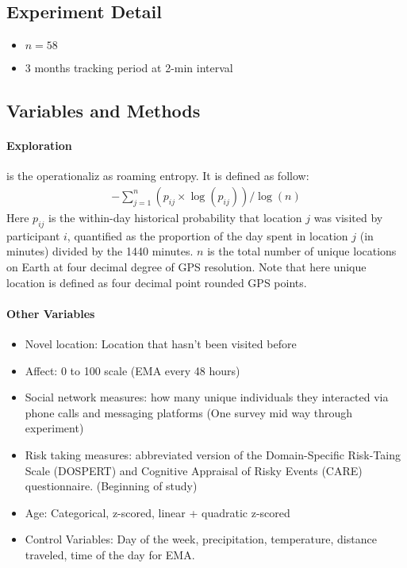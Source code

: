 \subsection{Experiment Detail} 
    \begin{itemize}
        \item $n = 58$
        \item 3 months tracking period at 2-min interval
    \end{itemize}

\subsection{Variables and Methods} 
\paragraph{Exploration} is the operationaliz as roaming entropy. It is defined as follow: 
    \begin{align*}
        -\sum_{j=1}^n \left( p_{ij} \times \log(p_{ij})\right) / \log(n)
    \end{align*}
Here $p_{ij}$ is the within-day historical probability that location $j$ was visited by participant $i$, quantified as the proportion of the day spent in location $j$ (in minutes) divided by the 1440 minutes. $n$ is the total number of unique locations on Earth at four decimal degree of GPS resolution. Note that here unique location is defined as four decimal point rounded GPS points. 

\paragraph{Other Variables}
    \begin{itemize}
        \item Novel location: Location that hasn't been visited before
        \item Affect: 0 to 100 scale (EMA every 48 hours) 
        \item Social network measures: how many unique individuals they interacted via phone calls and messaging platforms  (One survey mid way through experiment)
        \item Risk taking measures: abbreviated version of the Domain-Specific Risk-Taing Scale (DOSPERT) and Cognitive Appraisal of Risky Events (CARE) questionnaire. (Beginning of study)
        \item Age: Categorical, z-scored, linear + quadratic z-scored
        \item Control Variables: Day of the week, precipitation, temperature, distance traveled, time of the day for EMA. 
    \end{itemize}
